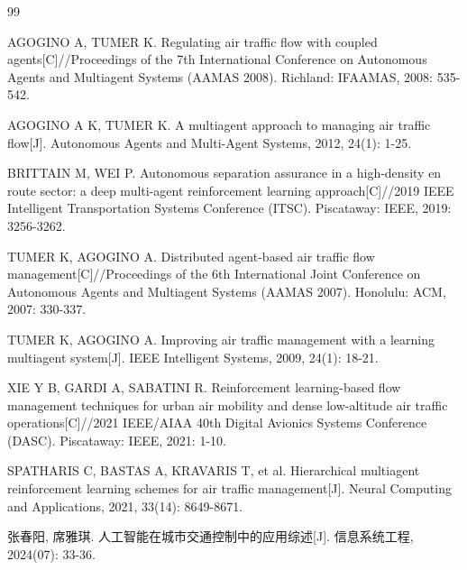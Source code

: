 \documentclass[12pt,a4paper,UTF8]{ctexart}
\begin{document}
\begin{thebibliography}{99}

 AGOGINO A, TUMER K. Regulating air traffic flow with coupled agents[C]//Proceedings of the 7th International Conference on Autonomous Agents and Multiagent Systems (AAMAS 2008). Richland: IFAAMAS, 2008: 535-542.

 AGOGINO A K, TUMER K. A multiagent approach to managing air traffic flow[J]. Autonomous Agents and Multi-Agent Systems, 2012, 24(1): 1-25.

 BRITTAIN M, WEI P. Autonomous separation assurance in a high-density en route sector: a deep multi-agent reinforcement learning approach[C]//2019 IEEE Intelligent Transportation Systems Conference (ITSC). Piscataway: IEEE, 2019: 3256-3262.

 TUMER K, AGOGINO A. Distributed agent-based air traffic flow management[C]//Proceedings of the 6th International Joint Conference on Autonomous Agents and Multiagent Systems (AAMAS 2007). Honolulu: ACM, 2007: 330-337.

 TUMER K, AGOGINO A. Improving air traffic management with a learning multiagent system[J]. IEEE Intelligent Systems, 2009, 24(1): 18-21.

 XIE Y B, GARDI A, SABATINI R. Reinforcement learning-based flow management techniques for urban air mobility and dense low-altitude air traffic operations[C]//2021 IEEE/AIAA 40th Digital Avionics Systems Conference (DASC). Piscataway: IEEE, 2021: 1-10.

 SPATHARIS C, BASTAS A, KRAVARIS T, et al. Hierarchical multiagent reinforcement learning schemes for air traffic management[J]. Neural Computing and Applications, 2021, 33(14): 8649-8671.

 张春阳, 席雅琪. 人工智能在城市交通控制中的应用综述[J]. 信息系统工程, 2024(07): 33-36.


\end{thebibliography}
\end{document}
